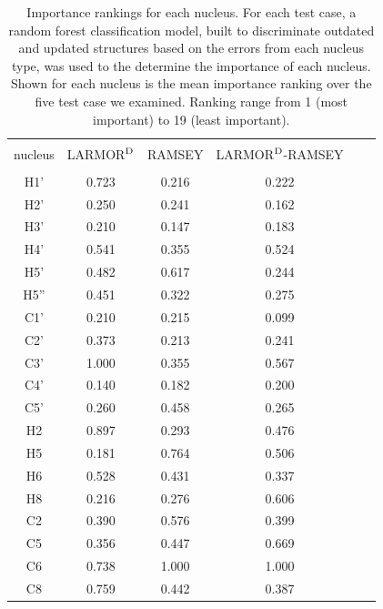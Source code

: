 \documentclass[fleqn,10pt]{wlscirep}
\begin{document}
\begin{table}[h]
\centering
\begin{threeparttable}
\begin{tabular}{c c c c c c}
\hline
\\
nucleus & LARMOR$^{\rm D}$ & RAMSEY & LARMOR$^{\rm D}$-RAMSEY \\
\\
\hline
H1' & 0.723 & 0.216 & 0.222 \\
H2' & 0.250 & 0.241 & 0.162 \\
H3' & 0.210 & 0.147 & 0.183 \\
H4' & 0.541 & 0.355 & 0.524 \\
H5' & 0.482 & 0.617 & 0.244 \\
H5''& 0.451 & 0.322 & 0.275 \\
C1' & 0.210 & 0.215 & 0.099 \\
C2' & 0.373 & 0.213 & 0.241 \\
C3' & 1.000 & 0.355 & 0.567 \\
C4' & 0.140 & 0.182 & 0.200 \\
C5' & 0.260 & 0.458 & 0.265 \\
H2  & 0.897 & 0.293 & 0.476 \\
H5  & 0.181 & 0.764 & 0.506 \\
H6  & 0.528 & 0.431 & 0.337 \\
H8  & 0.216 & 0.276 & 0.606 \\
C2  & 0.390 & 0.576 & 0.399 \\
C5  & 0.356 & 0.447 & 0.669 \\
C6  & 0.738 & 1.000 & 1.000 \\
C8  & 0.759 & 0.442 & 0.387 \\
\hline
\end{tabular}
\end{threeparttable}
\caption{\label{tab:importance_nucleus}  Importance rankings for each nucleus. For each test case, a random forest classification model, built to discriminate outdated and updated structures based on the errors from each nucleus type, was used to the determine the importance of each nucleus. Shown for each nucleus is the mean importance ranking over the five test case we examined. Ranking range from 1 (most important) to 19 (least important).}
\end{table}
\end{document}
